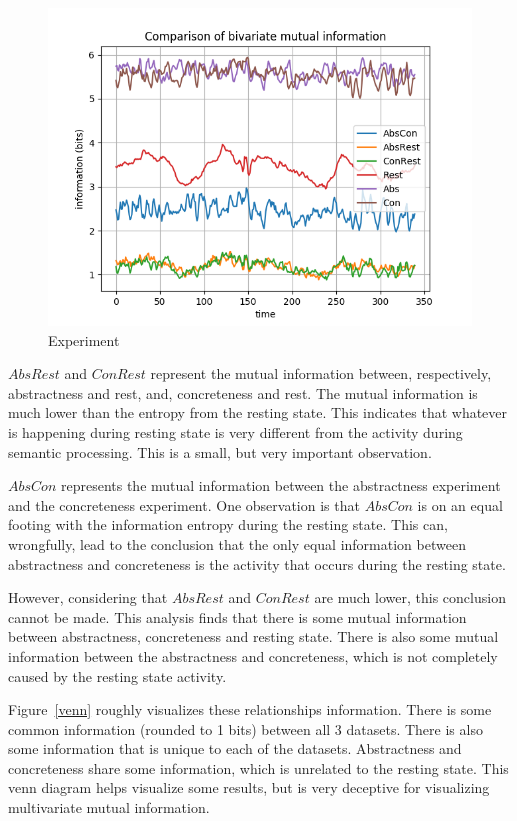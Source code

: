 \begin{figure}[!htb]
\caption{Experiment}
\label{all-channel-1}
    \centering
    \includegraphics[width=\textwidth]{fig/all-channel-1}
\end{figure}

$AbsRest$ and $ConRest$ represent the mutual information between, respectively, abstractness and rest, and, concreteness and rest. The mutual information is much lower than the entropy from the resting state. This indicates that whatever is happening during resting state is very different from the activity during semantic processing. This is a small, but very important observation.

$AbsCon$ represents the mutual information between the abstractness experiment and the concreteness experiment. One observation is that $AbsCon$ is on an equal footing with the information entropy during the resting state. This can, wrongfully, lead to the conclusion that the only equal information between abstractness and concreteness is the activity that occurs during the resting state.

However, considering that $AbsRest$ and $ConRest$ are much lower, this conclusion cannot be made. This analysis finds that there is some mutual information between abstractness, concreteness and resting state. There is also some mutual information between the abstractness and concreteness, which is not completely caused by the resting state activity. 

Figure~\ref{venn} roughly visualizes these relationships information. There is some common information (rounded to 1 bits) between all 3 datasets. There is also some information that is unique to each of the datasets. Abstractness and concreteness share some information, which is unrelated to the resting state. This venn diagram helps visualize some results, but is very deceptive for visualizing multivariate mutual information.


